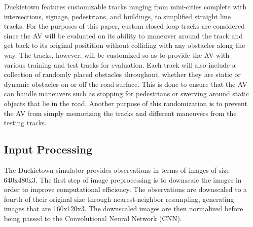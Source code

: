 \documentclass[conference]{IEEEtran}
\begin{document}
Duckietown features customizable tracks ranging from mini-cities complete with intersections, signage,
pedestrians, and buildings, to simplified straight line tracks. For the purposes of this paper,
custom closed loop tracks are considered since the AV will be evaluated on its ability to maneuver 
around the track and get back to its original positition without colliding with any obstacles along 
the way. The tracks, however, will be customized so as to provide the AV with various training and 
test tracks for evaluation. Each track will also include a collection of randomly placed obstacles 
throughout, whether they are static or dynamic obstacles on or off the road surface. This is done 
to ensure that the AV can handle maneuvers such as stopping for pedestrians or swerving around static 
objects that lie in the road. Another purpose of this randomization is to prevent the AV from simply
memorizing the tracks and different maneuvers from the testing tracks. 

\subsection{Input Processing}
The Duckietown simulator provides observations in terms of images of size 640x480x3. The first step
of image preprocessing is to downscale the images in order to improve computational efficiency. 
The observations are downscaled to a fourth of their original size through nearest-neighbor
resampling, generating images that are 160x120x3. The downscaled images are then normalized 
before being passed to the Convolutional Neural Network (CNN).
\end{document}
